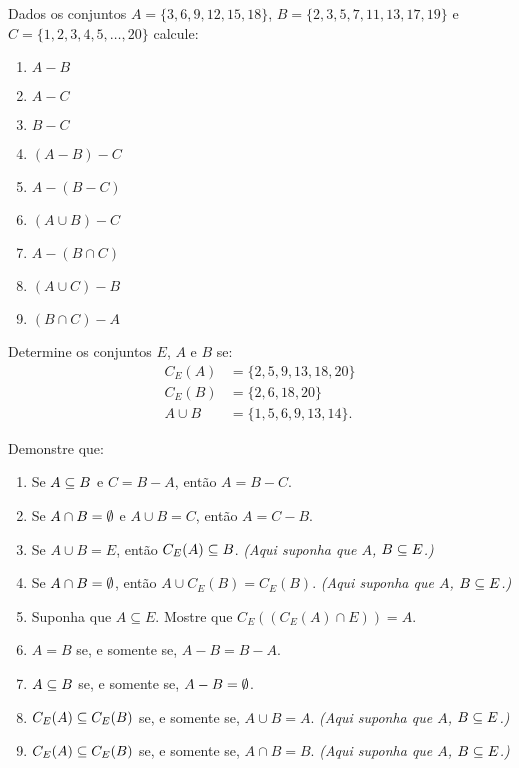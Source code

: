 \documentclass[12pt]{exam}
\begin{document}
\questao{} Dados os conjuntos $A = \{3,6,9,12,15,18\}$, $B = \{2,3,5,7,11,13,17,19\}$ e $C = \{1,2,3,4,5,\dots,20\}$ calcule:
\begin{multicols}{3}
    \begin{enumerate}[label={\alph*})]
        \item $A - B$
        \item $A - C$
        \item $B - C$
        \item $(A - B) - C$
        \item $A - (B - C)$
        \item $(A \cup B) - C$
        \item $A - (B \cap C)$
        \item $(A \cup C) - B$
        \item $(B \cap C) - A$
    \end{enumerate}
\end{multicols}

\questao{} Determine os conjuntos $E$, $A$ e $B$ se:
\begin{align*}
    C_E(A) &= \{2, 5, 9, 13, 18, 20\}\\
    C_E(B) &= \{2, 6, 18, 20\}\\
    A \cup B &= \{1, 5, 6, 9, 13, 14\}.
\end{align*}

\newpage
\questao{} Demonstre que:
\begin{enumerate}[label={\alph*})]

    \item Se $A \subseteq B$ e $C = B - A$, ent\~ao $A = B - C$.

    \item Se $A \cap B = \emptyset$ e $A \cup B = C$, ent\~ao $A = C - B$.

    \item Se $A\cup B = E$, ent\~ao $C_E(A) \subseteq B$. \textit{(Aqui suponha que $A$, $B \subseteq E$.)}

    \item Se $A \cap B = \emptyset$, ent\~ao $A \cup C_E(B) = C_E(B)$. \textit{(Aqui suponha que $A$, $B \subseteq E$.)}

    \item Suponha que $A \subseteq E$. Mostre que $C_E((C_E(A) \cap E)) = A$.

    \item $A = B$ se, e somente se, $A - B = B - A$.

    \item $A \subseteq B$ se, e somente se, $A - B = \emptyset$.

    \item $C_E(A) \subseteq C_E(B)$ se, e somente se, $A \cup B = A$. \textit{(Aqui suponha que $A$, $B \subseteq E$.)}

    \item $C_E(A) \subseteq C_E(B)$ se, e somente se, $A \cap B = B$. \textit{(Aqui suponha que $A$, $B \subseteq E$.)}

\end{enumerate}
\end{document}
